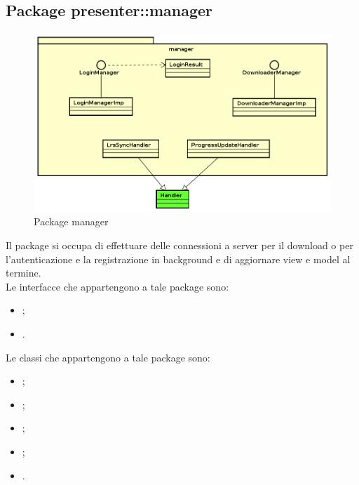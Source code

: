 \documentclass[../Tesi.tex]{subfiles}
\begin{document}
	\subsection{Package presenter::manager}
		\begin{figure}[H]
			\centering
			\includegraphics[scale=0.6]{images/package_diagrams/manager}
				\caption{Package manager}
		\end{figure}
		Il package  si occupa di effettuare delle connessioni a server per il download o per l'autenticazione e la registrazione in background e di aggiornare view e model al termine. \\
		Le interfacce che appartengono a tale package sono:
		\begin{itemize}
			\item {};
			\item {}.
		\end{itemize}
		Le classi che appartengono a tale package sono:
		\begin{itemize}
			\item {};
			\item {};
			\item {};
			\item {};
			\item {}.
		\end{itemize}
\end{document}
